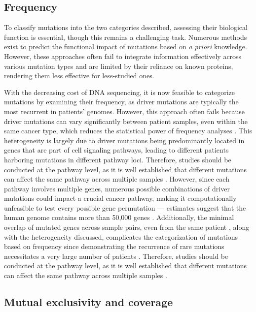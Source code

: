 \subsection{Frequency}

To classify mutations into the two categories described, assessing their biological function is essential, though this remains a challenging task. Numerous methods exist to predict the functional impact of mutations based on \textit{a priori} knowledge. However, these approaches often fail to integrate information effectively across various mutation types and are limited by their reliance on known proteins, rendering them less effective for less-studied ones.

With the decreasing cost of DNA sequencing, it is now feasible to categorize mutations by examining their frequency, as driver mutations are typically the most recurrent in patients' genomes. However, this approach often fails because driver mutations can vary significantly between patient samples, even within the same cancer type, which reduces the statistical power of frequency analyses \cite{multi-dendrix}. This heterogeneity is largely due to driver mutations being predominantly located in genes that are part of cell signaling pathways, leading to different patients harboring mutations in different pathway loci. Therefore, studies should be conducted at the pathway level, as it is well established that different mutations can affect the same pathway across multiple samples \cite{multi-dendrix}. However, since each pathway involves multiple genes, numerous possible combinations of driver mutations could impact a crucial cancer pathway, making it computationally unfeasible to test every possible gene permutation \cite{dendrix} --- estimates suggest that the human genome contains more than 50,000 genes \cite{n-genes}. Additionally, the minimal overlap of mutated genes across sample pairs, even from the same patient \cite{mdpfinder}, along with the heterogeneity discussed, complicates the categorization of mutations based on frequency since demonstrating the recurrence of rare mutations necessitates a very large number of patients \cite{dendrix}. Therefore, studies should be conducted at the pathway level, as it is well established that different mutations can affect the same pathway across multiple samples \cite{multi-dendrix}.

\subsection{Mutual exclusivity and coverage}

